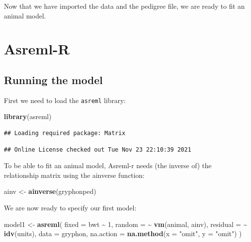 \documentclass[
  12pt,
]{book}
\newenvironment{Shaded}{\begin{snugshade}}{\end{snugshade}}
\newcommand{\DataTypeTok}[1]{\textcolor[rgb]{0.13,0.29,0.53}{#1}}
\newcommand{\DecValTok}[1]{\textcolor[rgb]{0.00,0.00,0.81}{#1}}
\newcommand{\KeywordTok}[1]{\textcolor[rgb]{0.13,0.29,0.53}{\textbf{#1}}}
\newcommand{\NormalTok}[1]{#1}
\newcommand{\OperatorTok}[1]{\textcolor[rgb]{0.81,0.36,0.00}{\textbf{#1}}}
\newcommand{\StringTok}[1]{\textcolor[rgb]{0.31,0.60,0.02}{#1}}
\begin{document}
Now that we have imported the data and the pedigree file, we are ready to fit an animal model.

\hypertarget{asreml-r-1}{%
\section{Asreml-R}\label{asreml-r-1}}

\hypertarget{running-the-model}{%
\subsection{Running the model}\label{running-the-model}}

First we need to load the \texttt{asreml} library:

\begin{Shaded}
\begin{Highlighting}[]
\KeywordTok{library}\NormalTok{(asreml)}
\end{Highlighting}
\end{Shaded}

\begin{verbatim}
## Loading required package: Matrix
\end{verbatim}

\begin{verbatim}
## Online License checked out Tue Nov 23 22:10:39 2021
\end{verbatim}

To be able to fit an animal model, Asreml-r needs (the inverse of) the relationship matrix using the ainverse function:

\begin{Shaded}
\begin{Highlighting}[]
\NormalTok{ainv \textless{}{-}}\StringTok{ }\KeywordTok{ainverse}\NormalTok{(gryphonped)}
\end{Highlighting}
\end{Shaded}

We are now ready to specify our first model:

\begin{Shaded}
\begin{Highlighting}[]
\NormalTok{model1 \textless{}{-}}\StringTok{ }\KeywordTok{asreml}\NormalTok{(}
  \DataTypeTok{fixed =}\NormalTok{ bwt }\OperatorTok{\textasciitilde{}}\StringTok{ }\DecValTok{1}\NormalTok{, }\DataTypeTok{random =} \OperatorTok{\textasciitilde{}}\StringTok{ }\KeywordTok{vm}\NormalTok{(animal, ainv),}
  \DataTypeTok{residual =} \OperatorTok{\textasciitilde{}}\StringTok{ }\KeywordTok{idv}\NormalTok{(units),}
  \DataTypeTok{data =}\NormalTok{ gryphon,}
  \DataTypeTok{na.action =} \KeywordTok{na.method}\NormalTok{(}\DataTypeTok{x =} \StringTok{"omit"}\NormalTok{, }\DataTypeTok{y =} \StringTok{"omit"}\NormalTok{)}
\NormalTok{)}
\end{Highlighting}
\end{Shaded}
\end{document}
